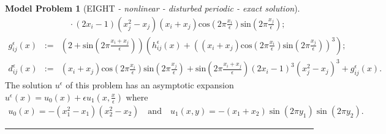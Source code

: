 \documentclass[a4paper,11pt]{article}
\theoremstyle{definition}
\newtheorem{modelproblem}{Model Problem} %
\begin{document}
\begin{modelproblem}[EIGHT {\it- nonlinear - disturbed periodic - exact solution}]
\begin{eqnarray*}
&\enspace& \quad \cdot
 ( 2 x_i - 1) (x_j^2 - x_j ) ( x_i + x_j ) \mbox{cos}( 2 \pi \frac{x_i}{\epsilon} ) \mbox{sin}( 2 \pi \frac{x_j}{\epsilon} ); \\
g_{ij}^{\epsilon}(x) &:=& (2 + \mbox{sin}( 2 \pi \frac{x_i + x_j}{\epsilon} ) ) \left( h_{ij}^{\epsilon}(x) + \left( ( x_i + x_j ) \mbox{cos}( 2 \pi \frac{x_i}{\epsilon} ) \mbox{sin}( 2 \pi \frac{x_j}{\epsilon} ) \right)^3 \right); \\
 d^{\epsilon}_{ij}(x) &:=& ( x_i + x_j ) \mbox{cos}( 2 \pi \frac{x_i}{\epsilon} ) \mbox{sin}( 2 \pi \frac{x_j}{\epsilon} ) + \mbox{sin}( 2 \pi \frac{x_i + x_j}{\epsilon} ) (2 x_i - 1 )^3 ( x_j^2 - x_j )^3 + g_{ij}^{\epsilon}(x).
\end{eqnarray*}
The solution $u^{\epsilon}$ of this problem has an asymptotic expansion $u^{\epsilon}(x) = u_0(x) + \epsilon u_1(x,\frac{x}{\epsilon})$ where
\begin{eqnarray*}
 u_0(x) = - (x_1^2 - x_1)(x_2^2 - x_2) \quad \mbox{and} \quad u_1(x,y) = - (x_1 + x_2) \sin(2 \pi y_1) \sin(2 \pi y_2).
\end{eqnarray*}

\end{modelproblem}
\hrule
\end{document}

